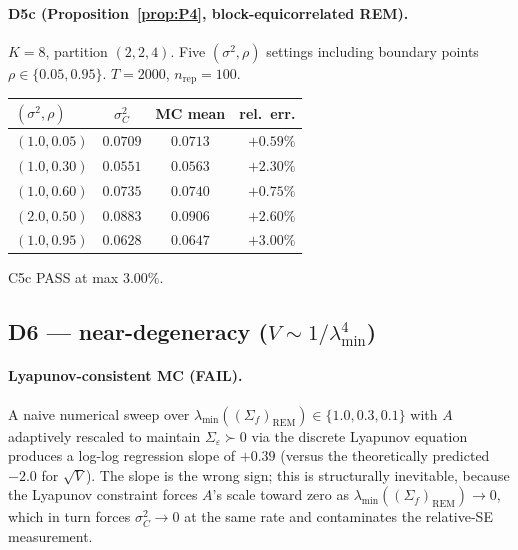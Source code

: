 \documentclass[11pt,letterpaper]{article}
\theoremstyle{remark}
\newcommand{\REM}{\mathrm{REM}}
\newcommand{\Sigmaf}{\Sigma_f}
\newcommand{\Sigmae}{\Sigma_\varepsilon}
\newcommand{\sigC}{\sigma^2_C}
\begin{document}
\paragraph{D5c (Proposition~\ref{prop:P4}, block-equicorrelated REM).} $K = 8$, partition $(2, 2, 4)$. Five $(\sigma^2, \rho)$ settings including boundary points $\rho \in \{0.05, 0.95\}$. $T = 2000$, $n_{\mathrm{rep}} = 100$.
\begin{center}
\begin{tabular}{lccr}
\toprule
$(\sigma^2, \rho)$ & $\sigC$ & MC mean & rel.\ err. \\
\midrule
$(1.0, 0.05)$ & $0.0709$ & $0.0713$ & $+0.59\%$ \\
$(1.0, 0.30)$ & $0.0551$ & $0.0563$ & $+2.30\%$ \\
$(1.0, 0.60)$ & $0.0735$ & $0.0740$ & $+0.75\%$ \\
$(2.0, 0.50)$ & $0.0883$ & $0.0906$ & $+2.60\%$ \\
$(1.0, 0.95)$ & $0.0628$ & $0.0647$ & $+3.00\%$ \\
\bottomrule
\end{tabular}
\end{center}
C5c PASS at max $3.00\%$.

\subsection{\texorpdfstring{D6 --- near-degeneracy ($V \sim 1/\lambda_{\min}^4$)}{D6 --- near-degeneracy (V scales as 1/lambda\_min\textasciicircum 4)}}

\paragraph{Lyapunov-consistent MC (FAIL).} A naive numerical sweep over $\lambda_{\min}((\Sigmaf)_\REM) \in \{1.0, 0.3, 0.1\}$ with $A$ adaptively rescaled to maintain $\Sigmae \succ 0$ via the discrete Lyapunov equation produces a log-log regression slope of $+0.39$ (versus the theoretically predicted $-2.0$ for $\sqrt{V}$). The slope is the wrong sign; this is structurally inevitable, because the Lyapunov constraint forces $A$'s scale toward zero as $\lambda_{\min}((\Sigmaf)_\REM) \to 0$, which in turn forces $\sigC \to 0$ at the same rate and contaminates the relative-SE measurement.
\end{document}
